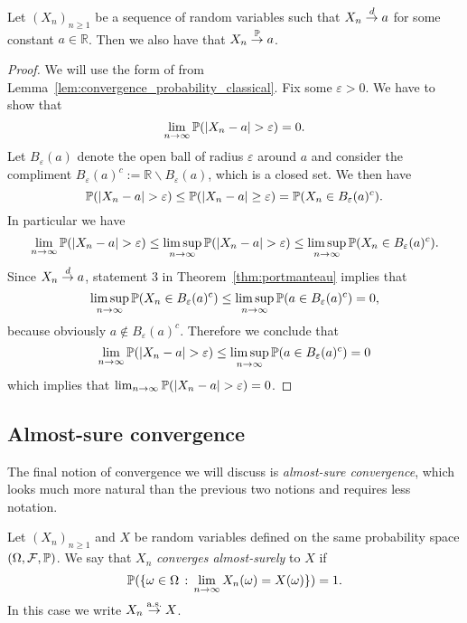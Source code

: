 \begin{lemma}{}\label{lem:dlim_constant_plim}
Let $(X_n)_{n \ge 1}$ be a sequence of random variables such that $X_n \stackrel{d}{\rightarrow} a$ for some constant $a \in \mathbb{R}$. Then we also have that $X_n \stackrel{\mathbb P}{\rightarrow} a$.
\end{lemma}

\begin{proof}
We will use the form of from Lemma~\ref{lem:convergence_probability_classical}. Fix some $\varepsilon > 0$. We have to show that
\[
	\lim_{n \to \infty} \bbP(|X_n-a|>\varepsilon) = 0.
\]
Let $B_\varepsilon(a)$ denote the open ball of radius $\varepsilon$ around $a$ and consider the compliment $B_\varepsilon(a)^c := \mathbb{R} \backslash B_\varepsilon(a)$, which is a closed set. We then have
\[
	\bbP(|X_n-a|>\varepsilon) \le \bbP(|X_n-a|\ge\varepsilon) = \bbP(X_n \in B_\varepsilon(a)^c). 
\]
In particular we have
\[
	\lim_{n \to \infty} \bbP(|X_n-a|>\varepsilon) \le \limsup_{n \to \infty} \bbP(|X_n-a|>\varepsilon)
	\le \limsup_{n \to \infty} \bbP(X_n \in B_\varepsilon(a)^c).
\]
Since $X_n \stackrel{d}{\rightarrow} a$, statement 3 in Theorem~\ref{thm:portmanteau} implies that 
\[
	\limsup_{n \to \infty} \mathbb P(X_n \in B_\varepsilon(a)^c)
	\le \limsup_{n \to \infty} \mathbb P(a \in B_\varepsilon(a)^c) = 0,
\]
because obviously $a \notin B_\varepsilon(a)^c$. Therefore we conclude that
\[
	\lim_{n \to \infty} \bbP(|X_n-a|>\varepsilon)
	\le \limsup_{n \to \infty} \bbP(a \in B_\varepsilon(a)^c) = 0
\]
which implies that $\lim_{n \to \infty} \bbP(|X_n-a|>\varepsilon) = 0$.
\end{proof}


\subsection{Almost-sure convergence}

The final notion of convergence we will discuss is \emph{almost-sure convergence}, which looks much more natural than the previous two notions and requires less notation.

\begin{definition}\label{def:almost_sure_convergence}
Let $(X_n)_{n \ge 1}$ and $X$ be random variables defined on the same probability space $(\Omega, \mathcal F, \mathbb P)$. We say that $X_n$ \emph{converges almost-surely} to $X$ if
\[
	\mathbb P(\{\omega \in \Omega \, : \, \lim_{n \to \infty} X_n(\omega) = X(\omega)\}) = 1.
\] 
In this case we write $X_n \stackrel{\mathrm{a.s.}}{\rightarrow} X$.
\end{definition} 

